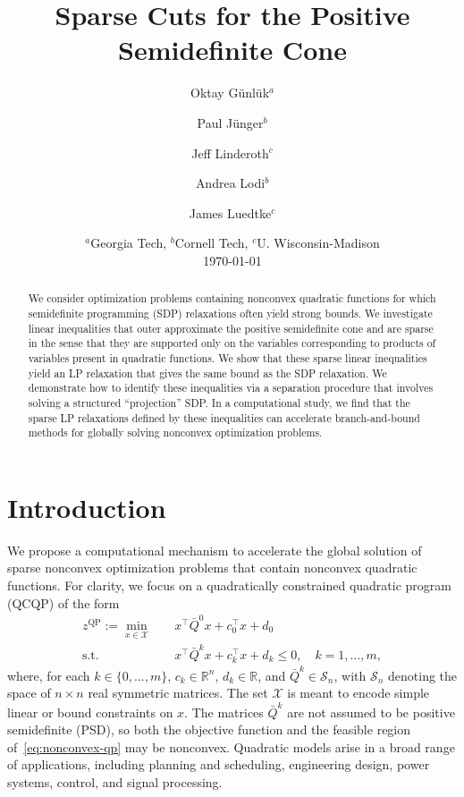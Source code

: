 \documentclass[twoside]{article}
\title{Sparse Cuts for the Positive Semidefinite Cone}
\author{Oktay G\"unl\"uk$^a$ \and Paul J\"unger$^b$ \and {Jeff Linderoth}$^c$ \and Andrea Lodi$^b$ \and James Luedtke$^c$}
\date{$^a$Georgia Tech, $^b$Cornell Tech, $^c$U. Wisconsin-Madison \\[.3cm] \today}
\newcommand{\R}{\mathbb{R}}
\newcommand{\citep}[1]{\cite{#1}}
\begin{document}
	
	\maketitle
	\begin{abstract}
		We consider optimization problems containing nonconvex quadratic functions for which semidefinite programming (SDP) relaxations often yield strong bounds.
		We investigate linear inequalities that outer approximate the positive semidefinite cone and are sparse in the sense that they are supported only on the variables corresponding to products of variables present in quadratic functions. We show that these sparse linear inequalities yield an LP relaxation that gives the same bound as the SDP relaxation.
		We demonstrate how to identify these inequalities via a separation procedure that involves solving a structured ``projection'' SDP.  In a computational study, we find that the sparse LP relaxations defined by these inequalities can accelerate branch-and-bound methods for globally solving nonconvex optimization problems.
	\end{abstract}
	
	
	\newcommand{\BnBx}{B\&B}
	\newcommand{\BnB}{B\&B }
	\newcommand{\PSDx}{PSD}
	\newcommand{\PSD}{PSD }
	\newcommand{\SDPx}{SDP}
	\newcommand{\SDP}{SDP }
	\newcommand{\LPx}{LP}
	\newcommand{\LP}{LP }
	
	\section{Introduction}
	\label{sec:intro}
	
	
	We propose a computational mechanism to accelerate the global solution of sparse nonconvex optimization problems that contain nonconvex quadratic functions. For clarity, we focus on a quadratically constrained quadratic program (QCQP) of the form
	\begin{subequations}
		\label{eq:nonconvex-qp}
		\begin{align}
			z^{\mathrm{QP}} := \min_{x\in\mathcal X} \quad & x^\top \bar Q^0 x + c_0^\top x + d_0 \label{eq:qp-obj}\\
			\text{s.t.} \quad & x^\top \bar Q^k x + c_k^\top x + d_k \leq 0,
			\quad k=1,\ldots,m, \label{eq:qp-cons}
		\end{align}
	\end{subequations}
	where, for each $k\in\{0,\ldots,m\}$, $c_k\in\R^n$, $d_k\in\R$, and $\bar Q^k\in\mathcal S_n$, with $\mathcal S_n$ denoting the space of $n\times n$ real symmetric matrices. The set $\mathcal X$ is meant to encode simple linear or bound constraints on $x$. The matrices $\bar Q^k$ are not assumed to be positive semidefinite (PSD), so both the objective function and the feasible region of~\eqref{eq:nonconvex-qp} may be nonconvex. Quadratic models arise in a broad range of applications, including planning and scheduling, engineering design, power systems, control, and signal processing\citep{floudas.visweswaran:95, burer.letchford:12, pezeshki.scharf.chong:10}.
	
\end{document}
